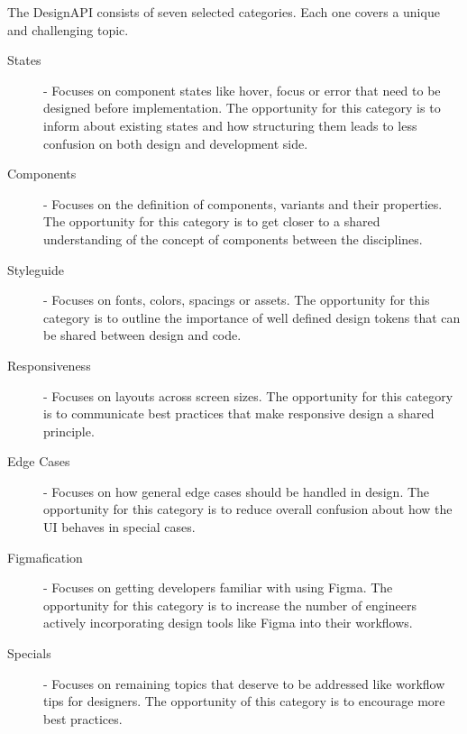 %


The DesignAPI consists of seven selected categories. Each one covers a unique and challenging topic.

\begin{description}
    \item[States] - Focuses on component states like hover, focus or error that need to be
          designed before implementation. The opportunity for this category is to inform about
          existing states and how structuring them leads to less confusion on both design and
          development side.

    \item[Components] - Focuses on the definition of components, variants and their properties.
          The opportunity for this category is to get closer to a shared understanding of the
          concept of components between the disciplines.

    \item[Styleguide] - Focuses on fonts, colors, spacings or assets. The opportunity for this
          category is to outline the importance of well defined design tokens that can be shared
          between design and code.

    \item[Responsiveness] - Focuses on layouts across screen sizes. The opportunity for this
          category is to communicate best practices that make responsive design a shared
          principle.

    \item[Edge Cases] - Focuses on how general edge cases should be handled in design. The
          opportunity for this category is to reduce overall confusion about how the UI behaves in
          special cases.

    \item[Figmafication] - Focuses on getting developers familiar with using Figma. The
          opportunity for this category is to increase the number of engineers actively
          incorporating design tools like Figma into their workflows.

    \item[Specials] - Focuses on remaining topics that deserve to be addressed like workflow tips
          for designers. The opportunity of this category is to encourage more best practices.
\end{description}

